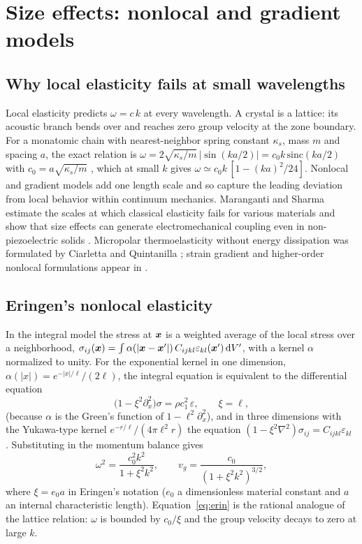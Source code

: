\section{Size effects: nonlocal and gradient models}\label{sec:size}
\subsection{Why local elasticity fails at small wavelengths}
Local elasticity predicts $\omega=c\,k$ at every wavelength. A crystal is a lattice: its acoustic branch bends over and reaches zero group velocity at the zone boundary. For a monatomic chain with nearest-neighbor spring constant $\kappa_s$, mass $m$ and spacing $a$, the exact relation is $\omega=2\sqrt{\kappa_s/m}\,|\sin(ka/2)|=c_0k\,\mathrm{sinc}(ka/2)$ with $c_0=a\sqrt{\kappa_s/m}$ \citep{BornKarman1912}, which at small $k$ gives $\omega\simeq c_0k\,[1-(ka)^2/24]$. Nonlocal and gradient models add one length scale and so capture the leading deviation from local behavior within continuum mechanics. Maranganti and Sharma \citep{Maranganti2007} estimate the scales at which classical elasticity fails for various materials and show that size effects can generate electromechanical coupling even in non-piezoelectric solids \citep{Maranganti2006}. Micropolar thermoelasticity without energy dissipation was formulated by Ciarletta \citep{Ciarletta1999} and Quintanilla \citep{Quintanilla2002}; strain gradient and higher-order nonlocal formulations appear in \citep{Gao2007,Lim2015,Ke2014}.

\subsection{Eringen's nonlocal elasticity}
In the integral model the stress at $\bm x$ is a weighted average of the local stress over a neighborhood,
$\sigma_{ij}(\bm x)=\int\alpha(|\bm x-\bm x'|)\,C_{ijkl}\varepsilon_{kl}(\bm x')\,\mathrm d V'$, with a kernel $\alpha$ normalized to unity. For the exponential kernel in one dimension, $\alpha(|x|)=e^{-|x|/\ell}/(2\ell)$, the integral equation is equivalent to the differential equation
\begin{equation}
\bigl(1-\xi^2\partial_x^2\bigr)\sigma=\rho c_1^2\,\varepsilon,\qquad \xi=\ell,\label{eq:eringen}
\end{equation}
(because $\alpha$ is the Green's function of $1-\ell^2\partial_x^2$), and in three dimensions with the Yukawa-type kernel $e^{-r/\ell}/(4\pi\ell^2r)$ the equation $(1-\xi^2\nabla^2)\sigma_{ij}=C_{ijkl}\varepsilon_{kl}$ \citep{Eringen1972,Eringen1983,Eringen2002}. Substituting in the momentum balance gives
\begin{equation}
\omega^2=\frac{c_0^2k^2}{1+\xi^2k^2},\qquad v_g=\frac{c_0}{(1+\xi^2k^2)^{3/2}},\label{eq:erin}
\end{equation}
where $\xi=e_0a$ in Eringen's notation ($e_0$ a dimensionless material constant and $a$ an internal characteristic length). Equation~\eqref{eq:erin} is the rational analogue of the lattice relation: $\omega$ is bounded by $c_0/\xi$ and the group velocity decays to zero at large $k$.

